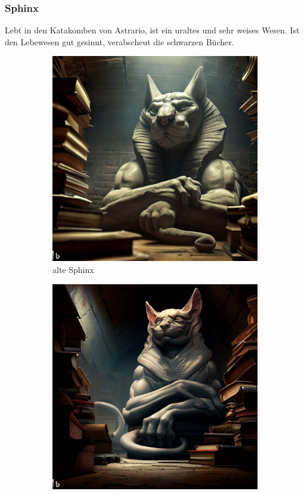 \documentclass[11pt, twoside]{article}
\begin{document}
\subsubsection{Sphinx\label{sphinx}}
\label{sec:orgbb7857c}
Lebt in den Katakomben von Astrario, ist ein uraltes und sehr weises Wesen. Ist den Lebewesen gut gesinnt, verabscheut die schwarzen Bücher.
\begin{figure}[H]
\centering
\caption{Sphinx}
\label{fig:sphinx}
  \begin{subfigure}{0.3\textwidth}
    \centering
    \includegraphics[width=0.99\linewidth]{sphinx1.jpeg}
    \caption{alte Sphinx}
  \end{subfigure}%
  \begin{subfigure}{0.3\textwidth}
    \centering
    \includegraphics[width=0.99\linewidth]{sphinx2.jpeg}

\end{subfigure}
\end{figure}
\end{document}
